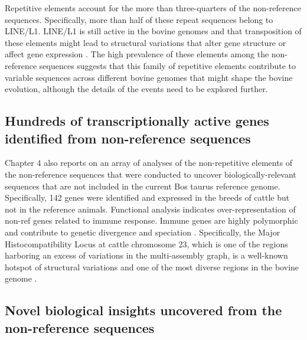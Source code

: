 \documentclass[../main.tex]{subfiles}
\begin{document}
Repetitive elements account for the more than three-quarters of the non-reference sequences. Specifically, more than half of these repeat sequences belong to LINE/L1. LINE/L1 is still active in the bovine genomes and that transposition of these elements might lead to structural variations that alter gene structure or affect gene expression \citep{adelson2009characterization,beck2011line,chen2017detection}. The high prevalence of these elements among the non-reference sequences suggests that this family of repetitive elements contribute to variable sequences across different bovine genomes that might shape the bovine evolution, although the details of the events need to be explored further.

\subsection*{Hundreds of transcriptionally active genes identified from non-reference sequences}

Chapter 4 also reports on an array of analyses of the non-repetitive elements of the non-reference sequences that were conducted to uncover biologically-relevant sequences that are not included in the current Bos taurus reference genome. Specifically, 142 genes were identified and expressed in the breeds of cattle but not in the reference animals. Functional analysis indicates over-representation of non-ref genes related to immune response. Immune genes are highly polymorphic and contribute to genetic divergence and speciation \citep{chen2019large}. Specifically, the Major Histocompatibility Locus at cattle chromosome 23, which is one of the regions harboring an excess of variations in the multi-assembly graph, is a well-known hotspot of structural variations and one of the most diverse regions in the bovine genome \citep{Hu2020}. 

\subsection*{Novel biological insights uncovered from the non-reference sequences}
\end{document}
